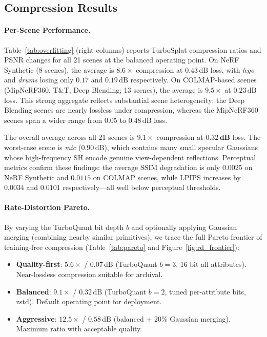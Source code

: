 \documentclass[sigconf,review]{acmart}
\newcommand{\ours}{TurboSplat}
\newcommand{\dB}{\,\text{dB}}
\begin{document}
\subsection{Compression Results}
\label{sec:results}

\paragraph{Per-Scene Performance.}
Table~\ref{tab:overfitting} (right columns) reports \ours{} compression ratios and PSNR changes for all 21 scenes at the balanced operating point.
On NeRF Synthetic (8 scenes), the average is $8.6{\times}$ compression at $0.43\dB$ loss, with \textit{lego} and \textit{drums} losing only $0.17$ and $0.19\dB$ respectively.
On COLMAP-based scenes (MipNeRF360, T\&T, Deep Blending; 13 scenes), the average is $9.5{\times}$ at $0.23\dB$ loss.
This strong aggregate reflects substantial scene heterogeneity: the Deep Blending scenes are nearly lossless under compression, whereas the MipNeRF360 scenes span a wider range from $0.05$ to $0.48\dB$ loss.

The overall average across all 21 scenes is $\mathbf{9.1{\times}}$ compression at $\mathbf{0.32\dB}$ loss.
The worst-case scene is \textit{mic} ($0.90\dB$), which contains many small specular Gaussians whose high-frequency SH encode genuine view-dependent reflections.
Perceptual metrics confirm these findings: the average SSIM degradation is only $0.0025$ on NeRF Synthetic and $0.0115$ on COLMAP scenes, while LPIPS increases by $0.0034$ and $0.0101$ respectively---all well below perceptual thresholds.

\paragraph{Rate-Distortion Pareto.}
By varying the TurboQuant bit depth $b$ and optionally applying Gaussian merging (combining nearby similar primitives), we trace the full Pareto frontier of training-free compression (Table~\ref{tab:pareto} and Figure~\ref{fig:rd_frontier}):
\begin{itemize}
  \item \textbf{Quality-first}: $5.6{\times}$ / $0.07\dB$ (TurboQuant $b{=}3$, 16-bit all attributes). Near-lossless compression suitable for archival.
  \item \textbf{Balanced}: $9.1{\times}$ / $0.32\dB$ (TurboQuant $b{=}2$, tuned per-attribute bits, zstd). Default operating point for deployment.
  \item \textbf{Aggressive}: $12.5{\times}$ / $0.58\dB$ (balanced + 20\% Gaussian merging). Maximum ratio with acceptable quality.
\end{itemize}
\end{document}
